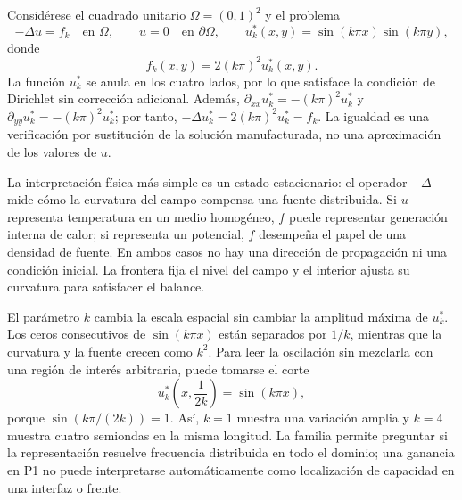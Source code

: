 Considérese el cuadrado unitario $\Omega=(0,1)^2$ y el problema
\begin{equation}
-\Delta u=f_k \quad \text{en }\Omega,
\qquad u=0 \quad \text{en }\partial\Omega,
\qquad
u_k^*(x,y)=\sin(k\pi x)\sin(k\pi y),
\label{eq:expansion-p1-poisson}
\end{equation}
donde
\begin{equation}
f_k(x,y)=2(k\pi)^2u_k^*(x,y).
\label{eq:expansion-p1-source}
\end{equation}
La función $u_k^*$ se anula en los cuatro lados, por lo que satisface la
condición de Dirichlet sin corrección adicional. Además,
$\partial_{xx}u_k^*=-(k\pi)^2u_k^*$ y
$\partial_{yy}u_k^*=-(k\pi)^2u_k^*$; por tanto,
$-\Delta u_k^*=2(k\pi)^2u_k^*=f_k$. La igualdad es una verificación por
sustitución de la solución manufacturada, no una aproximación de los valores
de $u$.

La interpretación física más simple es un estado estacionario: el operador
$-\Delta$ mide cómo la curvatura del campo compensa una fuente distribuida.
Si $u$ representa temperatura en un medio homogéneo, $f$ puede representar
generación interna de calor; si representa un potencial, $f$ desempeña el
papel de una densidad de fuente. En ambos casos no hay una dirección de
propagación ni una condición inicial. La frontera fija el nivel del campo y
el interior ajusta su curvatura para satisfacer el balance.

El parámetro $k$ cambia la escala espacial sin cambiar la amplitud máxima de
$u_k^*$. Los ceros consecutivos de $\sin(k\pi x)$ están separados por
$1/k$, mientras que la curvatura y la fuente crecen como $k^2$. Para leer
la oscilación sin mezclarla con una región de interés arbitraria, puede
tomarse el corte
\begin{equation}
u_k^*\!\left(x,\frac{1}{2k}\right)=\sin(k\pi x),
\label{eq:expansion-p1-corte}
\end{equation}
porque $\sin(k\pi/(2k))=1$. Así, $k=1$ muestra una variación amplia y
$k=4$ muestra cuatro semiondas en la misma longitud. La familia permite
preguntar si la representación resuelve frecuencia distribuida en todo el
dominio; una ganancia en P1 no puede interpretarse automáticamente como
localización de capacidad en una interfaz o frente.

